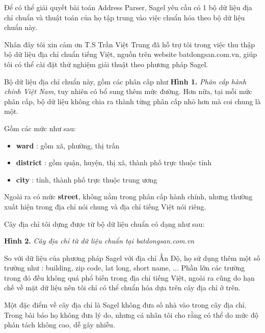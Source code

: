Để có thể giải quyết bài toán Address Parser, Sagel yêu cầu có 1 bộ dữ liệu địa chỉ chuẩn và thuật toán của họ tập trung vào việc chuẩn hóa theo bộ dữ liệu chuẩn này.

Nhân đây tôi xin cảm ơn T.S Trần Việt Trung đã hỗ trợ tôi trong việc thu thập bộ dữ liệu địa chỉ chuẩn tiếng Việt, nguồn trên website batdongsan.com.vn, giúp tôi có thể cài đặt thử nghiệm giải thuật theo phương pháp Sagel.

Bộ dữ liệu địa chỉ chuẩn này, gồm các phân cấp như \textbf{ Hình 1.}\textit{ Phân cấp hành chính Việt Nam}, tuy nhiên có bổ sung thêm mức đường. Hơn nữa, tại mỗi mức phân cấp, bộ dữ liệu không chia ra thành từng phân cấp nhỏ hơn mà coi chung là một. 

Gồm các mức như sau:
\begin{itemize}
    \item \textbf{ward} : gồm xã, phường, thị trấn
    \item \textbf{district} : gồm quận, huyện, thị xã, thành phố trực thuộc tỉnh
    \item \textbf{city} : tỉnh, thành phố trực thuộc trung ương
\end{itemize}

Ngoài ra có mức \textbf{street}, không nằm trong phân cấp hành chính, nhưng thường xuất hiện trong địa chỉ nói chung và địa chỉ tiếng Việt nói riêng.

Cây địa chỉ tôi dựng được từ bộ dữ liệu chuẩn có dạng như sau:
\begin{center}

\vspace*{1cm}
\textbf{Hình 2. } \textit{Cây địa chỉ từ dữ liệu chuẩn tại batdongsan.com.vn}
\end{center}

So với dữ liệu của phương pháp Sagel với địa chỉ Ấn Độ, họ sử dụng thêm một số trường như : building, zip code, lat long, short name, ... Phần lớn các trường trong đó đều không quá phổ biến trong địa chỉ tiếng Việt, ngoài ra cũng do hạn chế về mặt dữ liệu nên tôi chỉ có thể chuẩn hóa dựa trên cây địa chỉ ở trên. 

Một đặc điểm về  cây địa chỉ là Sagel không đưa số nhà vào trong cây địa chỉ. Trong bài báo họ không đưa lý do, nhưng cá nhân tôi cho rằng có thể do mức độ phân tách không cao, dễ gây nhiễu. 

